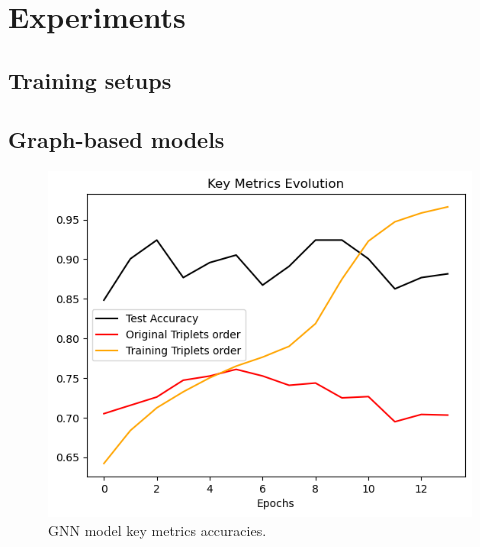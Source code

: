\chapter{Experiments}
\label{sec:experiments}

\section{Training setups}
\label{sec:training-setups}

\section{Graph-based models}
\label{Graph-based models}
\begin{figure}[]
    \centering
    \includegraphics[width=0.5\columnwidth]{images/key_metrics_evolution_gnn.png}
    \caption{GNN model key metrics accuracies.}
    \label{fig:key_metrics_evolution_gnn}
\end{figure}

